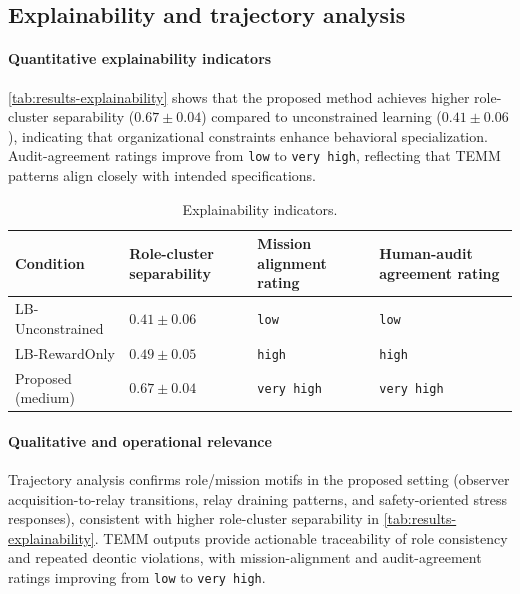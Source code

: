 \documentclass[sigconf]{aamas}
\begin{document}
\subsection{Explainability and trajectory analysis}

\paragraph{Quantitative explainability indicators}
\autoref{tab:results-explainability} shows that the proposed method achieves higher role-cluster separability ($0.67 \pm 0.04$) compared to unconstrained learning ($0.41 \pm 0.06$), indicating that organizational constraints enhance behavioral specialization. Audit-agreement ratings improve from \texttt{low} to \texttt{very high}, reflecting that TEMM patterns align closely with intended specifications.

\begin{table}[h!]
    \caption{Explainability indicators.}
    \label{tab:results-explainability}
    \centering
    \scriptsize
    \begin{tabularx}{\columnwidth}{l p{1.8cm} p{1.8cm} p{1.8cm}}
        \toprule
        Condition         & Role-cluster separability & Mission alignment rating & Human-audit agreement rating \\
        \midrule
        LB-Unconstrained  & $0.41 \pm 0.06$           & \texttt{low}             & \texttt{low}                 \\
        LB-RewardOnly     & $0.49 \pm 0.05$           & \texttt{high}            & \texttt{high}                \\
        Proposed (medium) & $\mathbf{0.67 \pm 0.04}$  & \texttt{very high}       & \texttt{very high}           \\
        \bottomrule
    \end{tabularx}
\end{table}

\paragraph{Qualitative and operational relevance}
Trajectory analysis confirms role/mission motifs in the proposed setting (observer acquisition-to-relay transitions, relay draining patterns, and safety-oriented stress responses), consistent with higher role-cluster separability in \autoref{tab:results-explainability}. TEMM outputs provide actionable traceability of role consistency and repeated deontic violations, with mission-alignment and audit-agreement ratings improving from \texttt{low} to \texttt{very high}.
\end{document}
